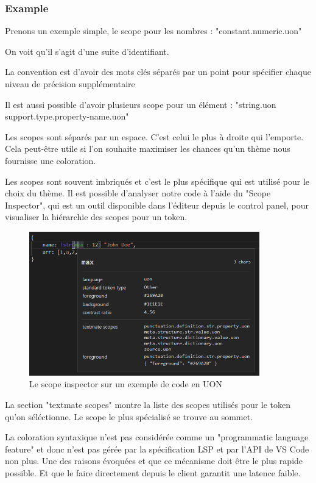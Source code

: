 \documentclass[
    iict, %
    il, %
]{heig-tb}
\begin{document}
\subsubsection{Example}
Prenons un exemple simple, le scope pour les nombres : "constant.numeric.uon"

On voit qu'il s'agit d'une suite d'identifiant.

La convention est d'avoir des mots clés séparés par un point pour spécifier chaque niveau de précision supplémentaire

Il est aussi possible d'avoir plusieurs scope pour un élément : "string.uon support.type.property-name.uon"

Les scopes sont séparés par un espace.
C'est celui le plus à droite qui l'emporte. Cela peut-être utile si l'on souhaite maximiser les chances qu'un thème nous fournisse une coloration.


Les scopes sont souvent imbriqués et c'est le plus spécifique qui est utilisé pour le choix du thème.
Il est possible d'analyser notre code à l'aide du "Scope Inspector", qui est un outil disponible dans l'éditeur depuis le control panel,
pour visualiser la hiérarchie des scopes pour un token.

\begin{figure}[!h]
    \begin{center}
        \includegraphics[width=10cm]{assets/figures/scope-inspector.png}
    \end{center}
    \caption[Scope inspector]{\label{basic-uon} Le scope inspector sur un exemple de code en UON}
\end{figure}

La section "textmate scopes" montre la liste des scopes utilisés pour le token qu'on séléctionne. Le scope le plus spécialisé se trouve au sommet.

La coloration syntaxique n'est pas considérée comme un "programmatic language feature" et donc n'est pas gérée par la spécification LSP et par l'API de VS Code non plus.
Une des raisons évoquées et que ce mécanisme doit être le plus rapide possible. Et que le faire directement depuis le client garantit une latence faible.
\end{document}
